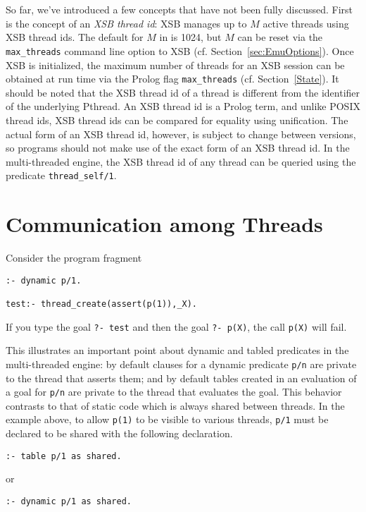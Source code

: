 So far, we've introduced a few concepts that have not been fully
discussed.  First is the concept of an {\em XSB thread id}: XSB
manages up to $M$ active threads using XSB thread ids.  The default
for $M$ in \version{} is 1024, but $M$ can be reset via the {\tt
  max\_threads} command line option to XSB
(cf. Section~\ref{sec:EmuOptions}).  Once XSB is initialized, the
maximum number of threads for an XSB session can be obtained at run
time via the Prolog flag {\tt max\_threads} (cf. Section~\ref{State}).
It should be noted that the XSB thread id of a thread is different
from the identifier of the underlying Pthread.  An XSB thread id is a
Prolog term, and unlike POSIX thread ids, XSB thread ids can be
compared for equality using unification.  The actual form of an XSB
thread id, however, is subject to change between versions, so programs
should not make use of the exact form of an XSB thread id.  In the
multi-threaded engine, the XSB thread id of any thread can be queried
using the predicate {\tt thread\_self/1}.

\section{Communication among Threads}

\begin{example}
Consider the program fragment
%
\begin{verbatim}
:- dynamic p/1.

test:- thread_create(assert(p(1)),_X).
\end{verbatim}
If you type the goal {\tt ?- test} and then the goal {\tt ?- p(X)},
the call {\tt p(X)} will fail.  
\end{example}

\noindent
This illustrates an important point about dynamic and tabled
predicates in the multi-threaded engine: by default clauses for a
dynamic predicate {\tt p/n} are private to the thread that asserts
them; and by default tables created in an evaluation of a goal for
{\tt p/n} are private to the thread that evaluates the goal.  This
behavior contrasts to that of static code which is always shared
between threads.  In the example above, to allow {\tt p(1)} to be
visible to various threads, {\tt p/1} must be declared to be shared
with the following declaration.
%
\begin{verbatim}
:- table p/1 as shared.
\end{verbatim}
or
\begin{verbatim}
:- dynamic p/1 as shared.
\end{verbatim}

